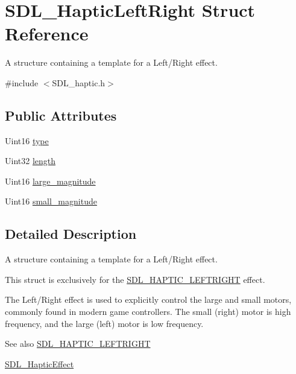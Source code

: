 \hypertarget{struct_s_d_l___haptic_left_right}{}\section{S\+D\+L\+\_\+\+Haptic\+Left\+Right Struct Reference}
\label{struct_s_d_l___haptic_left_right}


A structure containing a template for a Left/\+Right effect.  




{\ttfamily \#include $<$S\+D\+L\+\_\+haptic.\+h$>$}

\subsection*{Public Attributes}
\begin{DoxyCompactItemize}
\item 
Uint16 \mbox{\hyperlink{struct_s_d_l___haptic_left_right_abef79eeb482a8e623e512f0c9635e1a1}{type}}
\item 
Uint32 \mbox{\hyperlink{struct_s_d_l___haptic_left_right_a5b942fee53f1ec77d3fb91a6e89b0196}{length}}
\item 
Uint16 \mbox{\hyperlink{struct_s_d_l___haptic_left_right_a8cd16fe2200ef10cc4f3b4209adef959}{large\+\_\+magnitude}}
\item 
Uint16 \mbox{\hyperlink{struct_s_d_l___haptic_left_right_aaa1f2c1e767a780e447d82efce6cd1cf}{small\+\_\+magnitude}}
\end{DoxyCompactItemize}


\subsection{Detailed Description}
A structure containing a template for a Left/\+Right effect. 

This struct is exclusively for the \mbox{\hyperlink{_s_d_l__haptic_8h_ae047624d8458ff6400887c37a36f86d3}{S\+D\+L\+\_\+\+H\+A\+P\+T\+I\+C\+\_\+\+L\+E\+F\+T\+R\+I\+G\+HT}} effect.

The Left/\+Right effect is used to explicitly control the large and small motors, commonly found in modern game controllers. The small (right) motor is high frequency, and the large (left) motor is low frequency.

\begin{DoxySeeAlso}{See also}
\mbox{\hyperlink{_s_d_l__haptic_8h_ae047624d8458ff6400887c37a36f86d3}{S\+D\+L\+\_\+\+H\+A\+P\+T\+I\+C\+\_\+\+L\+E\+F\+T\+R\+I\+G\+HT}} 

\mbox{\hyperlink{union_s_d_l___haptic_effect}{S\+D\+L\+\_\+\+Haptic\+Effect}} 
\end{DoxySeeAlso}


